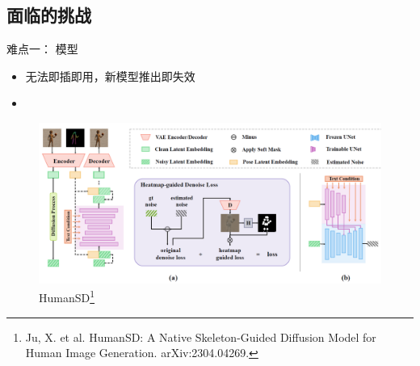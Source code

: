 \documentclass[
    fontset=fandol,
    xcolor=svgnames %
]{ctexbeamer}
\begin{document}
\subsection{面临的挑战}

\begin{frame}

    \begin{block}{难点一： 模型}
        \begin{itemize}
            \item 无法即插即用，新模型推出即失效
            \item 
        \end{itemize}
    \end{block}

    \begin{figure}
    \includegraphics[height=0.45\textheight]{../image/humansd.png}
            \caption{HumanSD\footnote{
Ju, X. et al. HumanSD: A Native Skeleton-Guided Diffusion Model for Human Image Generation. arXiv:2304.04269.}}
            \end{figure}
    

\end{frame}
    
\end{document}
